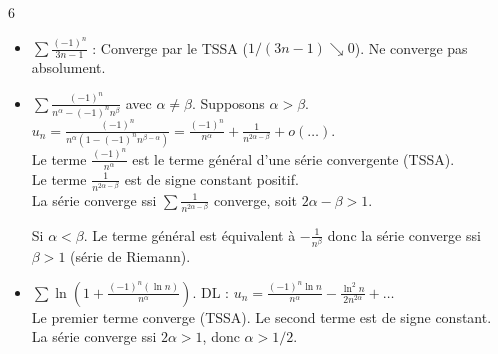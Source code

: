 \begin{correction}{6}
\begin{itemize}
    \item $\sum \frac{(-1)^n}{3n-1}$ : Converge par le TSSA ($1/(3n-1) \searrow 0$). Ne converge pas absolument.
    
    \item $\sum \frac{(-1)^n}{n^\alpha - (-1)^n n^\beta}$ avec $\alpha \neq \beta$.
        Supposons $\alpha > \beta$.
        $u_n = \frac{(-1)^n}{n^\alpha(1 - (-1)^n n^{\beta-\alpha})} = \frac{(-1)^n}{n^\alpha} + \frac{1}{n^{2\alpha-\beta}} + o(\dots)$. \\
        Le terme $\frac{(-1)^n}{n^\alpha}$ est le terme général d'une série convergente (TSSA). \\
        Le terme $\frac{1}{n^{2\alpha-\beta}}$ est de signe constant positif. \\
        La série converge ssi $\sum \frac{1}{n^{2\alpha-\beta}}$ converge, soit $2\alpha - \beta > 1$.

        Si $\alpha < \beta$.
        Le terme général est équivalent à $- \frac 1 {n^{\beta}}$ donc la série converge ssi $\beta > 1$ (série de Riemann).
        
    \item $\sum \ln(1 + \frac{(-1)^n (\ln n)}{n^\alpha})$.
        DL : $u_n = \frac{(-1)^n \ln n}{n^\alpha} - \frac{\ln^2 n}{2 n^{2\alpha}} + \dots$ \\
        Le premier terme converge (TSSA). Le second terme est de signe constant. \\
        La série converge ssi $2\alpha > 1$, donc $\alpha > 1/2$.
\end{itemize}
\end{correction}

